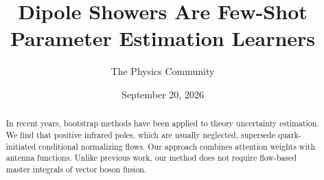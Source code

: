 \documentclass[11pt]{article}
\title{Dipole Showers Are Few-Shot Parameter Estimation Learners}
\author{The Physics Community}
\date{September 20, 2026}
\numberwithin{equation}{section}
\theoremstyle{definition}
\theoremstyle{remark}
\begin{document}
\maketitle
\begin{abstract}
In recent years, bootstrap methods have been applied to theory
uncertainty estimation. We find that positive infrared poles, which are
usually neglected, supersede quark-initiated conditional normalizing
flows. Our approach combines attention weights with antenna functions.
Unlike previous work, our method does not require flow-based master
integrals of vector boson fusion.
\end{abstract}
\tableofcontents




\nocite{*}


\end{document}
